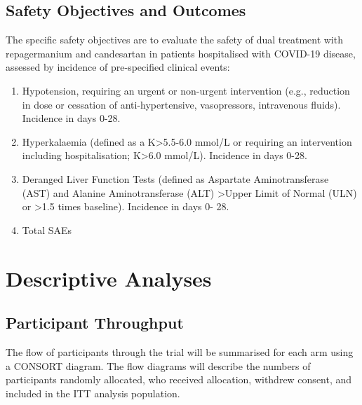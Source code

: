 \documentclass[11pt,parskip=half-]{scrartcl}
\begin{document}
\subsection{Safety Objectives and Outcomes}
The specific safety objectives are to evaluate the safety of dual treatment with repagermanium and candesartan in patients hospitalised with COVID-19 disease, assessed by incidence of pre-specified clinical events:

\begin{enumerate}[resume]
    \item Hypotension, requiring an urgent or non-urgent intervention (e.g., reduction in dose or cessation of anti-hypertensive, vasopressors, intravenous fluids). Incidence in days 0-28.
    \item  Hyperkalaemia (defined as a K>5.5-6.0 mmol/L or requiring an intervention including hospitalisation; K>6.0 mmol/L). Incidence in days 0-28.
    \item Deranged Liver Function Tests (defined as Aspartate Aminotransferase (AST) and Alanine Aminotransferase (ALT) >Upper Limit of Normal (ULN) or >1.5 times baseline). Incidence in days 0- 28.
    \item Total SAEs
\end{enumerate}

\clearpage

\section{Descriptive Analyses}

\subsection{Participant Throughput}
The flow of participants through the trial will be summarised for each arm using a CONSORT diagram. The flow diagrams will describe the numbers of participants randomly allocated, who received allocation, withdrew consent, and included in the ITT analysis population.
\end{document}

